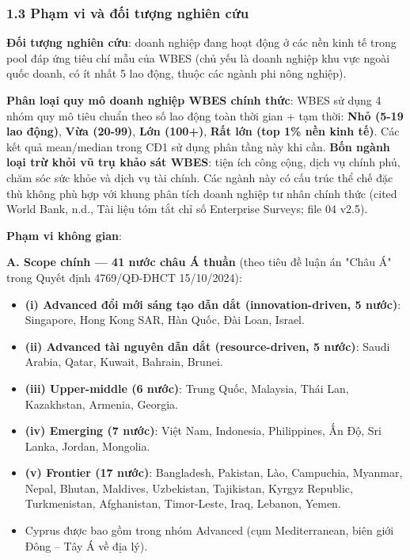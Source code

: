 \documentclass[12pt,a4paper]{article}
\providecommand{\tightlist}{\setlength{\itemsep}{0pt}\setlength{\parskip}{0pt}}
\begin{document}
\hypertarget{13-phux1ea1m-vi-vuxe0-ux111ux1ed1i-tux1b0ux1ee3ng-nghiuxean-cux1ee9u}{%
\subsubsection{1.3 Phạm vi và đối tượng nghiên
cứu}\label{13-phux1ea1m-vi-vuxe0-ux111ux1ed1i-tux1b0ux1ee3ng-nghiuxean-cux1ee9u}}

\textbf{Đối tượng nghiên cứu}: doanh nghiệp đang hoạt động ở các nền
kinh tế trong pool đáp ứng tiêu chí mẫu của WBES (chủ yếu là doanh
nghiệp khu vực ngoài quốc doanh, có ít nhất 5 lao động, thuộc các ngành
phi nông nghiệp).

\textbf{Phân loại quy mô doanh nghiệp WBES chính thức}: WBES sử dụng 4
nhóm quy mô tiêu chuẩn theo số lao động toàn thời gian + tạm thời:
\textbf{Nhỏ (5-19 lao động)}, \textbf{Vừa (20-99)}, \textbf{Lớn (100+)},
\textbf{Rất lớn (top 1\% nền kinh tế)}. Các kết quả mean/median trong
CĐ1 sử dụng phân tầng này khi cần. \textbf{Bốn ngành loại trừ khỏi vũ
trụ khảo sát WBES}: tiện ích công cộng, dịch vụ chính phủ, chăm sóc sức
khỏe và dịch vụ tài chính. Các ngành này có cấu trúc thể chế đặc thù
không phù hợp với khung phân tích doanh nghiệp tư nhân chính thức (cited
World Bank, n.d., Tài liệu tóm tắt chỉ số Enterprise Surveys; file 04
v2.5).

\textbf{Phạm vi không gian}:

\textbf{A. Scope chính --- 41 nước châu Á thuần} (theo tiêu đề luận án
"Châu Á" trong Quyết định 4769/QĐ-ĐHCT 15/10/2024):

\begin{itemize}
\tightlist
\item
  \textbf{(i) Advanced đổi mới sáng tạo dẫn dắt (innovation-driven, 5
  nước)}: Singapore, Hong Kong SAR, Hàn Quốc, Đài Loan, Israel.
\item
  \textbf{(ii) Advanced tài nguyên dẫn dắt (resource-driven, 5 nước)}:
  Saudi Arabia, Qatar, Kuwait, Bahrain, Brunei.
\item
  \textbf{(iii) Upper-middle (6 nước)}: Trung Quốc, Malaysia, Thái Lan,
  Kazakhstan, Armenia, Georgia.
\item
  \textbf{(iv) Emerging (7 nước)}: Việt Nam, Indonesia, Philippines, Ấn
  Độ, Sri Lanka, Jordan, Mongolia.
\item
  \textbf{(v) Frontier (17 nước)}: Bangladesh, Pakistan, Lào, Campuchia,
  Myanmar, Nepal, Bhutan, Maldives, Uzbekistan, Tajikistan, Kyrgyz
  Republic, Turkmenistan, Afghanistan, Timor-Leste, Iraq, Lebanon,
  Yemen.
\item
  Cyprus được bao gồm trong nhóm Advanced (cụm Mediterranean, biên giới
  Đông -- Tây Á về địa lý).
\end{itemize}
\end{document}
